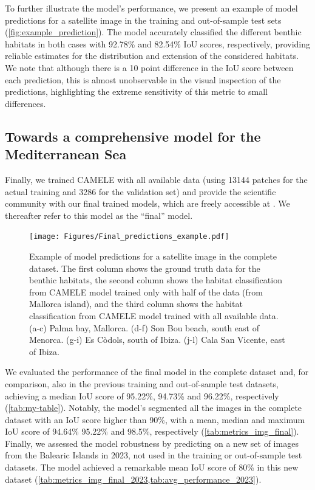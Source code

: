 To further illustrate the model's performance, we present an example of model
predictions for a satellite image in the training and out-of-sample test sets
(\cref{fig:example_prediction}). The model accurately classified the different
benthic habitats in both cases with 92.78\% and 82.54\% IoU scores,
respectively, providing reliable estimates for the distribution and extension
of the considered habitats. We note that although there is a 10 point
difference in the IoU score between each prediction, this is almost
unobservable in the visual inspection of the predictions, highlighting the
extreme sensitivity of this metric to small differences.

\subsection{Towards a comprehensive model for the Mediterranean Sea}

Finally, we trained CAMELE with all available data (using 13144 patches for the
actual training and 3286 for the validation set) and provide the scientific
community with our final trained models, which are freely accessible at
\cite{GimenezRomero_zenodo}. We thereafter refer to this model as the ``final''
model.

\begin{figure}[H]
    \centering
    \texttt{[image: Figures/Final\_predictions\_example.pdf]}
    \caption{Example of model predictions for a satellite image in the complete
        dataset. The first column shows the ground truth data for the benthic
        habitats, the second column shows the habitat classification from
        CAMELE model trained only with half of the data (from Mallorca island),
        and the third column shows the habitat classification from CAMELE model
        trained with all available data. (a-c) Palma bay, Mallorca. (d-f) Son
        Bou beach, south east of Menorca. (g-i) Es Còdols, south of Ibiza.
        (j-l) Cala San Vicente, east of Ibiza.}
    \label{fig:model_performance_complete}
\end{figure}

We evaluated the performance of the final model in the
complete dataset and, for comparison, also in the previous training and
out-of-sample test datasets, achieving a median IoU score of 95.22\%, 94.73\%
and 96.22\%, respectively (\cref{tab:my-table}). Notably, the model's
segmented all the images in the complete dataset with an IoU score higher than
90\%, with a mean, median and maximum IoU score of 94.64\% 95.22\% and 98.5\%,
respectively (\cref{tab:metrics_img_final}). Finally, we assessed the model
robustness by predicting on a new set of images from the Balearic Islands in
2023, not used in the training or out-of-sample test datasets. The model
achieved a remarkable mean IoU score of 80\% in this new dataset
(\cref{tab:metrics_img_final_2023,tab:avg_performance_2023}).

